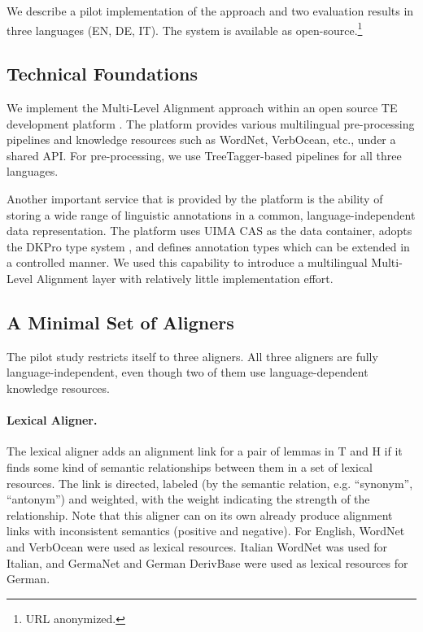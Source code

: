 \documentclass[11pt,letterpaper]{article}
\begin{document}
We describe a pilot implementation of the approach and two evaluation
results in three languages (EN, DE, IT). The system is available as
open-source.\footnote{{URL} anonymized.}  


\subsection{Technical Foundations}  
\label{sec:techn-found}

We implement the Multi-Level Alignment approach within an open source
TE development platform \cite{EOP-arch}. The platform provides various
multilingual pre-processing pipelines and knowledge resources such as
WordNet, VerbOcean, etc., under a shared API. For pre-processing, we
use TreeTagger-based pipelines for all three languages.

Another important service that is provided by the platform is the
ability of storing a wide range of linguistic annotations in a common,
language-independent data representation. The platform uses UIMA CAS
\cite{d04:_uima} as the data container, adopts the DKPro type system
\cite{DKpro}, and defines annotation types which can be extended in a
controlled manner. We used this capability to introduce a multilingual
Multi-Level Alignment layer %
with relatively little implementation effort.

\subsection{A Minimal Set of Aligners}

The pilot study restricts itself to three aligners.  
All three aligners are fully language-independent, even though two of
them use language-dependent knowledge resources. 

\paragraph{Lexical Aligner.} The lexical aligner adds an alignment link
for a pair of lemmas in T and H if it finds some kind of semantic
relationships between them in a set of lexical resources. The link is
directed, labeled (by the semantic relation, e.g. ``synonym'',
``antonym'') and weighted, with the weight indicating the strength of
the relationship. Note that this aligner can on its own already
produce alignment links with inconsistent semantics (positive and
negative). For English, WordNet and VerbOcean were used as lexical
resources. Italian WordNet was used for Italian, and GermaNet and
German DerivBase \cite{Zeller:2013} were used as lexical resources for
German.
\end{document}
